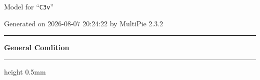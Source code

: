 \documentclass[fleqn,10pt,landscape]{jsarticle}
\begin{document}
\setcounter{MaxMatrixCols}{32}

\renewcommand{\tablename}{Table~}
\renewcommand{\figurename}{Figure~}
\setlength{\baselineskip}{16pt}
\setlength{\parindent}{0pt}
\setlength{\mathindent}{0pt}
\footnotesize
\begin{center}
\LARGE
Model for ``\texttt{C3v}''
\end{center}
\begin{flushright}
Generated on 2026-08-07 20:24:22 by MultiPie 2.3.2
\end{flushright}
\setlength{\baselineskip}{16pt}
\footnotesize
\vspace{5mm}
\noindent \rule[0.5mm]{5mm}{0.5mm}\hspace{3mm}\textbf{General Condition}\hspace{3mm}\leaders\hrule height 0.5mm\hfill\kern0pt
\vspace{3mm}
\end{document}
